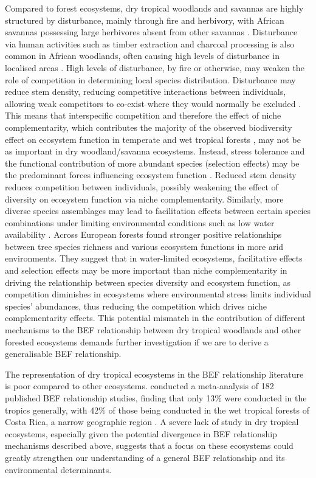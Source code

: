 \documentclass[11pt,a4paper]{article}
\begin{document}
Compared to forest ecosystems, dry tropical woodlands and savannas are highly structured by disturbance, mainly through fire and herbivory, with African savannas possessing large herbivores absent from other savannas \citep{Sankaran2008, Levick2009}. Disturbance via human activities such as timber extraction and charcoal processing is also common in African woodlands, often causing high levels of disturbance in localised areas \citep{}. High levels of disturbance, by fire or otherwise, may weaken the role of competition in determining local species distribution. Disturbance may reduce stem density, reducing competitive interactions between individuals, allowing weak competitors to co-exist where they would normally be excluded \citep{Grime1979, Grace1990}. This means that interspecific competition and therefore the effect of niche complementarity, which contributes the majority of the observed biodiversity effect on ecosystem function in temperate and wet tropical forests \citep{Wright2017, Poorter2015, Sande2017a}, may not be as important in dry woodland/savanna ecosystems. Instead, stress tolerance and the functional contribution of more abundant species (selection effects) may be the predominant forces influencing ecosystem function \citep{Lasky2014, Tobner2016}. Reduced stem density reduces competition between individuals, possibly weakening the effect of diversity on ecosystem function via niche complementarity. Similarly, more diverse species assemblages may lead to facilitation effects between certain species combinations under limiting environmental conditions such as low water availability \citep{}. Across European forests \citet{Ratcliffe2017} found stronger positive relationships between tree species richness and various ecosystem functions in more arid environments. They suggest that in water-limited ecosystems, facilitative effects and selection effects may be more important than niche complementarity in driving the relationship between species diversity and ecosystem function, as competition diminishes in ecosystems where environmental stress limits individual species' abundances, thus reducing the competition which drives niche complementarity effects. This potential mismatch in the contribution of different mechanisms to the BEF relationship between dry tropical woodlands and other forested ecosystems demands further investigation if we are to derive a generalisable BEF relationship.

The representation of dry tropical ecosystems in the BEF relationship literature is poor compared to other ecosystems. \citet{Clarke2017} conducted a meta-analysis of 182 published BEF relationship studies, finding that only 13\% were conducted in the tropics generally, with 42\% of those being conducted in the wet tropical forests of Costa Rica, a narrow geographic region \citep{Barthlott2005}. A severe lack of study in dry tropical ecosystems, especially given the potential divergence in BEF relationship mechanisms described above, suggests that a focus on these ecosystems could greatly strengthen our understanding of a general BEF relationship and its environmental determinants. 
\end{document}
